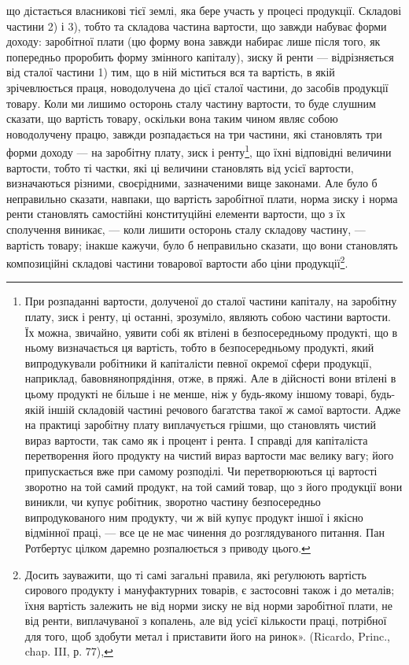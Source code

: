 \parcont{}  %
що дістається власникові тієї землі, яка бере участь у процесі продукції. Складові
частини 2) і 3), тобто та складова частина вартости, що завжди набуває
форми доходу: заробітної плати (цю форму вона завжди набирає лише після
того, як попередньо проробить форму змінного капіталу), зиску й ренти —
відрізняється від сталої частини 1) тим, що в ній міститься вся та вартість, в
якій зрічевлюється праця, новодолучена до цієї сталої частини, до засобів продукції
товару. Коли ми лишимо осторонь сталу частину вартости, то буде слушним
сказати, що вартість товару, оскільки вона таким чином являє собою новодолучену
працю, завжди розпадається на три частини, які становлять три форми
доходу — на заробітну плату, зиск і ренту\footnote{
При розпаданні вартости, долученої до сталої частини капіталу, на заробітну плату, зиск і ренту,
ці останні, зрозуміло, являють собою частини вартости. Їх можна, звичайно, уявити собі як втілені в
безпосередньому продукті, що в ньому визначається ця вартість, тобто в безпосередньому продукті,
який випродукували робітники й капіталісти певної окремої сфери продукції, наприклад,
бавовнянопрядіння, отже, в пряжі. Але в дійсності вони втілені в цьому продукті не більше і не
менше, ніж у будь-якому іншому товарі, будь-якій іншій складовій частині речового багатства такої ж
самої вартости. Адже на практиці заробітну плату виплачується грішми, що становлять чистий вираз
вартости, так само як і процент і рента. І справді для капіталіста перетворення його продукту на
чистий вираз вартости має велику вагу; його припускається вже при самому розподілі. Чи
перетворюються ці вартості зворотно на той самий продукт, на той самий товар, що з його продукції
вони виникли, чи купує
робітник, зворотно частину безпосередньо випродукованого ним продукту, чи ж вій купує продукт іншої
і якісно відмінної праці, — все це не має чинення до розглядуваного питання. Пан Ротбертус цілком
даремно розпалюється з приводу цього.
}, що їхні відповідні величини вартости,
тобто ті частки, які ці величини становлять від усієї вартости, визначаються
різними, своєрідними, зазначеними вище законами. Але було б неправильно
сказати, навпаки, що вартість заробітної плати, норма зиску і норма ренти
становлять самостійні конституційні елементи вартости, що з їх сполучення виникає,
— коли лишити осторонь сталу складову частину, — вартість товару; інакше
кажучи, було б неправильно сказати, що вони становлять композиційні складові
частини товарової вартости або ціни продукції\footnote{
Досить зауважити, що ті самі загальні правила, які реґулюють вартість сирового продукту і
мануфактурних товарів, є застосовні також і до металів; їхня вартість залежить не від норми зиску не
від норми заробітної плати, не від ренти, виплачуваної з копалень, але від усієї кількости праці,
потрібної для того, щоб здобути метал і приставити його на ринок». (Ricardo, Princ., chap. III, р.
77),
}.

